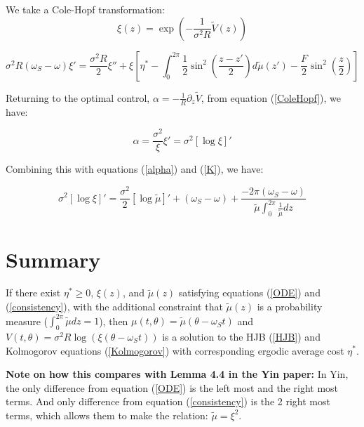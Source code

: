 \documentclass[]{article}
\begin{document}
We take a Cole-Hopf transformation:
\begin{equation}
\xi(z)=\exp\left(-\frac{1}{\sigma^2R}\tilde{V}(z)\right)
\label{ColeHopf}
\end{equation}

\begin{equation}
\sigma^2R(\omega_S-\omega) \xi'=\frac{\sigma^2R}{2} \xi'' + \xi \left[\eta^* -\int_0^{2\pi}\frac{1}{2} \sin^2\left(\frac{z-z'}{2}\right)d \tilde{\mu}(z')-\frac{F}{2} \sin^2\left(\frac{z}{2}\right)\right]
\label{ODE}
\end{equation}

Returning to the optimal control, $\alpha=-\frac{1}{R}\partial_z \tilde{V}$, from equation (\ref{ColeHopf}), we have:

\begin{equation}
\alpha=\frac{\sigma^2}{\xi}\xi'=\sigma^2 \left[\log\xi \right]'
\end{equation}

Combining this with equations (\ref{alpha}) and (\ref{K}), we have:

\begin{equation}
\sigma^2 \left[\log\xi \right]'=\frac{\sigma^2}{2} \left[\log\tilde{\mu}\right]'+(\omega_S-\omega)+\frac{-2\pi(\omega_S-\omega) }{\tilde{\mu}\int_0^{2\pi} \frac{1}{\tilde{\mu}}dz}
\label{consistency}
\end{equation}

\section{Summary}
If there exist $\eta^* \geq0$, $\xi(z)$, and $\tilde{\mu}(z)$ satisfying equations (\ref{ODE}) and (\ref{consistency}), with the additional constraint that $\tilde{\mu}(z)$ is a probability measure ($\int_0^{2\pi}\tilde{\mu}dz=1$), then $\mu(t,\theta)=\tilde{\mu}(\theta-\omega_S t)$ and $V(t,\theta)=\sigma^2R \log(\xi(\theta-\omega_S t))$ is a solution to the HJB (\ref{HJB}) and Kolmogorov equations (\ref{Kolmogorov}) with corresponding ergodic average cost $\eta^*$.

\textbf{Note on how this compares with Lemma 4.4 in the Yin paper:}
In Yin, the only difference from equation (\ref{ODE}) is the left most and the right most terms. And only difference from equation (\ref{consistency}) is the 2 right most terms, which allows them to make the relation: $\tilde{\mu}=\xi^2$.
\end{document}
